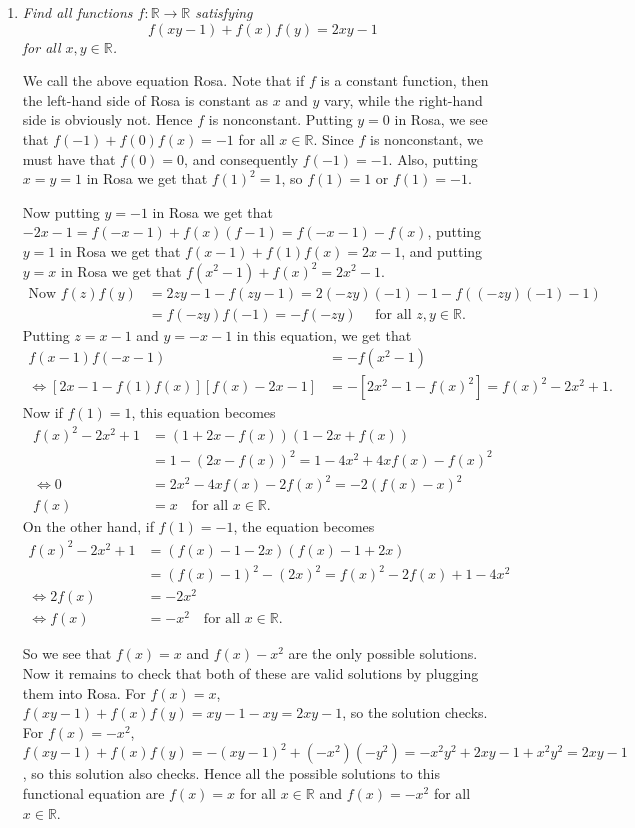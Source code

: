 \documentclass[a4paper,12pt]{article}
\begin{document}
\begin{enumerate}
	\item 
	\textit{Find all functions $f:\mathbb{R} \rightarrow \mathbb{R}$ satisfying $$f(xy-1)+f(x)f(y) = 2xy - 1$$ for all $x,y \in \mathbb{R}$.}
	
	We call the above equation Rosa. Note that if $f$ is a constant function, then the left-hand side of Rosa is constant as $x$ and $y$ vary, while the right-hand side is obviously not. Hence $f$ is nonconstant. Putting $y=0$ in Rosa, we see that $f(-1) +f(0)f(x) = -1$ for all $x\in\mathbb{R}$. Since $f$ is nonconstant, we must have that $f(0)=0$, and consequently $f(-1) = -1$. Also, putting $x=y=1$ in Rosa we get that $f(1)^2 = 1$, so $f(1) = 1$ or $f(1) = -1$.
	
	Now putting $y = -1$ in Rosa we get that $-2x-1 = f(-x-1) +f(x)(f-1) = f(-x-1)-f(x)$, putting $y=1$ in Rosa we get that $f(x-1) +f(1)f(x) = 2x-1$, and putting $y=x$ in Rosa we get that $f(x^2-1) +f(x)^2 = 2x^2-1$.
	\begin{align*} \text{Now } f(z)f(y) &= 2zy-1-f(zy-1) = 2(-zy)(-1) -1 -f((-zy)(-1)-1) \\ &= f(-zy)f(-1) = -f(-zy) \quad \text{ for all } z,y\in\mathbb{R}.\end{align*}
	Putting $z=x-1$ and $y=-x-1$ in this equation, we get that
	\begin{align*} f(x-1)f(-x-1) &= -f(x^2-1) \\
		\iff [2x-1-f(1)f(x)] [f(x)-2x-1] &= -[2x^2-1-f(x)^2] = f(x)^2 -2x^2 +1.
	\end{align*}
	Now if $f(1)=1$, this equation becomes \begin{align*} f(x)^2 -2x^2 +1 &= (1+2x-f(x))(1-2x+f(x)) \\ &= 1 -(2x-f(x))^2 = 1 -4x^2 +4xf(x) -f(x)^2 \\ \iff 0 &= 2x^2 -4xf(x) -2f(x)^2 = -2(f(x)-x)^2 \\ f(x) &= x \quad \text{for all } x\in\mathbb{R}. \end{align*}
	On the other hand, if $f(1) = -1$, the equation becomes
	\begin{align*} f(x)^2 -2x^2 +1 &= (f(x)-1-2x)(f(x)-1+2x) \\ &= (f(x)-1)^2 -(2x)^2 = f(x)^2-2f(x)+1-4x^2 \\ \iff 2f(x) &= -2x^2 \\ \iff f(x) &= -x^2 \quad \text{for all } x\in\mathbb{R}. \end{align*}
	
	So we see that $f(x)=x$ and $f(x)-x^2$ are the only possible solutions. Now it remains to check that both of these are valid solutions by plugging them into Rosa. For $f(x)=x$, $f(xy-1) +f(x)f(y) = xy-1-xy = 2xy-1$, so the solution checks. For $f(x)=-x^2$, $f(xy-1) +f(x)f(y) = -(xy-1)^2 +(-x^2)(-y^2) = -x^2y^2 +2xy -1 +x^2y^2 = 2xy-1$, so this solution also checks. Hence all the possible solutions to this functional equation are $f(x)=x$ for all $x\in\mathbb{R}$ and $f(x)=-x^2$ for all $x\in\mathbb{R}$.
	

\end{enumerate}
\end{document}
